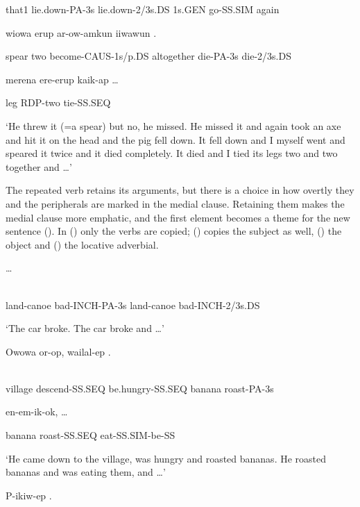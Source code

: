that1  lie.down-PA-3s  lie.down-2/3s.DS  1s.GEN  go-SS.SIM  again

wiowa  erup  ar-ow-amkun  iiwawun  .  

spear  two  become-CAUS-1s/p.DS  altogether  die-PA-3s  die-2/3s.DS

merena  ere-erup  kaik-ap  {\dots}

leg  RDP-two  tie-SS.SEQ

`He threw it (=a spear) but no, he missed. He missed it and again took an axe and hit it on the head and the pig fell down. It fell down and I myself went and speared it twice and it died completely. It died and I tied its legs two and two together and {\dots}'

The repeated verb retains its arguments, but there is a choice in how overtly they and the peripherals are marked in the medial clause. Retaining them makes the medial clause more emphatic, and the first element becomes a theme for the new sentence (). In () only the verbs are copied; () copies the subject as well, () the object and () the locative adverbial.

\ea%
\label{ex:x1506}
\gll {}   {\dots} \\
      \\
\glt
\z

land-canoe  bad-INCH-PA-3s  land-canoe  bad-INCH-2/3s.DS

`The car broke. The car broke and {\dots}'

\ea%
\label{ex:x1507}
\gll Owowa  or-op,  wailal-ep  .  \\
      \\
\glt
\z

village  descend-SS.SEQ  be.hungry-SS.SEQ  banana  roast-PA-3s

  en-em-ik-ok,  {\dots}

banana  roast-SS.SEQ  eat-SS.SIM-be-SS

`He came down to the village, was hungry and roasted bananas. He roasted bananas and was eating them, and {\dots}'

\ea%
\label{ex:x1508}
\gll P-ikiw-ep  .  \\
      \\
\glt
\z

